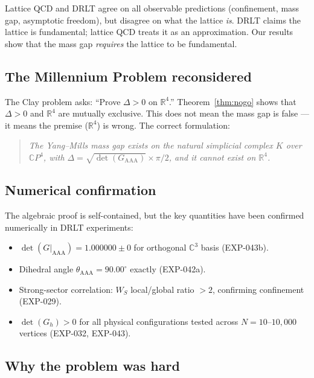 \documentclass[12pt]{article}
\theoremstyle{remark}
\begin{document}
\noindent
Lattice QCD and DRLT agree on all observable predictions (confinement,
mass gap, asymptotic freedom), but disagree on what the lattice \emph{is}.
DRLT claims the lattice is fundamental; lattice QCD treats it as an
approximation. Our results show that the mass gap \emph{requires}
the lattice to be fundamental.

\subsection{The Millennium Problem reconsidered}

The Clay problem asks: ``Prove $\Delta > 0$ on $\mathbb{R}^4$.''
Theorem~\ref{thm:nogo} shows that $\Delta > 0$ and $\mathbb{R}^4$ are
mutually exclusive. This does not mean the mass gap is false --- it
means the premise ($\mathbb{R}^4$) is wrong. The correct formulation:

\begin{quote}
\emph{The Yang--Mills mass gap exists on the natural simplicial complex
$K$ over $\mathbb{C}P^4$, with $\Delta = \sqrt{\det(G_{\mathrm{AAA}})}
\times \pi/2$, and it cannot exist on $\mathbb{R}^4$.}
\end{quote}

\subsection{Numerical confirmation}

The algebraic proof is self-contained, but the key quantities have been
confirmed numerically in DRLT experiments:

\begin{itemize}
\item $\det(G|_{\mathrm{AAA}}) = 1.000000 \pm 0$ for orthogonal
  $\mathbb{C}^3$ basis (EXP-043b).
\item Dihedral angle $\theta_{\mathrm{AAA}} = 90.00^\circ$ exactly
  (EXP-042a).
\item Strong-sector correlation: $W_S$ local/global ratio $> 2$,
  confirming confinement (EXP-029).
\item $\det(G_h) > 0$ for all physical configurations tested across
  $N = 10$--$10{,}000$ vertices (EXP-032, EXP-043).
\end{itemize}

\subsection{Why the problem was hard}
\end{document}
